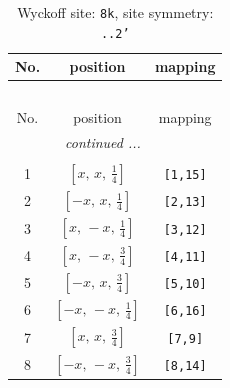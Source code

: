 \documentclass[fleqn,8pt]{jsarticle}
\begin{document}
\begin{longtable}{ccc}
\caption{Wyckoff site: {\tt 8k}, site symmetry: {\tt ..2'}}
 \\
 \hline \hline
No. & position & mapping \\ \hline \endfirsthead

\multicolumn{2}{l}{\tablename\ \thetable{}} \\
 \hline \hline
No. & position & mapping \\ \hline \endhead

 \hline \hline
\multicolumn{2}{r}{\footnotesize\it continued ...} \\ \endfoot

 \hline \hline
\multicolumn{2}{r}{} \\ \endlastfoot

1 & $\left[ x,\, x,\, \frac{1}{4} \right]$ & {\tt [1,15]} \\ \hline
2 & $\left[ - x,\, x,\, \frac{1}{4} \right]$ & {\tt [2,13]} \\ \hline
3 & $\left[ x,\, - x,\, \frac{1}{4} \right]$ & {\tt [3,12]} \\ \hline
4 & $\left[ x,\, - x,\, \frac{3}{4} \right]$ & {\tt [4,11]} \\ \hline
5 & $\left[ - x,\, x,\, \frac{3}{4} \right]$ & {\tt [5,10]} \\ \hline
6 & $\left[ - x,\, - x,\, \frac{1}{4} \right]$ & {\tt [6,16]} \\ \hline
7 & $\left[ x,\, x,\, \frac{3}{4} \right]$ & {\tt [7,9]} \\ \hline
8 & $\left[ - x,\, - x,\, \frac{3}{4} \right]$ & {\tt [8,14]} \\
\end{longtable}
\renewcommand{\arraystretch}{1.2}
\end{document}
